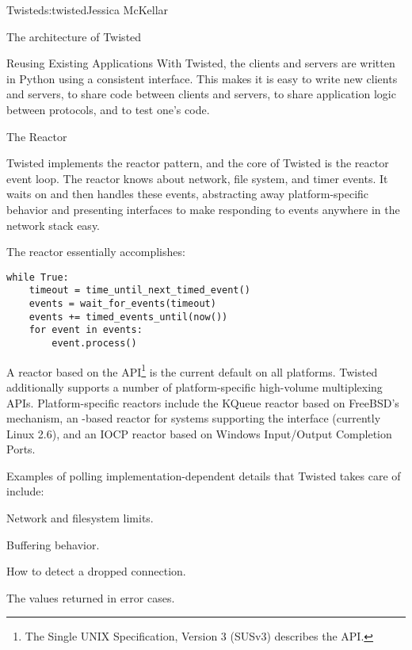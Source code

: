 \begin{aosachapter}{Twisted}{s:twisted}{Jessica McKellar}
\begin{aosasect1}{The architecture of Twisted}
\begin{aosasect2}{Reusing Existing Applications}
With Twisted, the clients and servers are written in Python using a
consistent interface. This makes it is easy to write new clients and servers, to
share code between clients and servers, to share application logic between
protocols, and to test one's code.

\end{aosasect2}

\begin{aosasect2}{The Reactor}

Twisted implements the reactor pattern, and the core of Twisted is the
reactor event loop. The reactor knows about network, file system, and timer
events. It waits on and then handles these events, abstracting away
platform-specific behavior and presenting interfaces to make responding to
events anywhere in the network stack easy.

The reactor essentially accomplishes:

\begin{verbatim}
while True:
    timeout = time_until_next_timed_event()
    events = wait_for_events(timeout)
    events += timed_events_until(now())
    for event in events:
        event.process()
\end{verbatim}

A reactor based on the  API\footnote{The Single UNIX
  Specification, Version 3 (SUSv3) describes the  API.} is
the current default on all platforms. Twisted additionally supports a
number of platform-specific high-volume multiplexing
APIs. Platform-specific reactors include the KQueue reactor based on
FreeBSD's  mechanism, an -based reactor for
systems supporting the  interface (currently Linux 2.6),
and an IOCP reactor based on Windows Input/Output Completion Ports.

Examples of polling implementation-dependent details that Twisted takes care
of include:

\begin{aosaitemize}

\item Network and filesystem limits.

\item Buffering behavior.

\item How to detect a dropped connection.

\item The values returned in error cases.

\end{aosaitemize}


\end{aosasect2}
\end{aosasect1}
\end{aosachapter}
